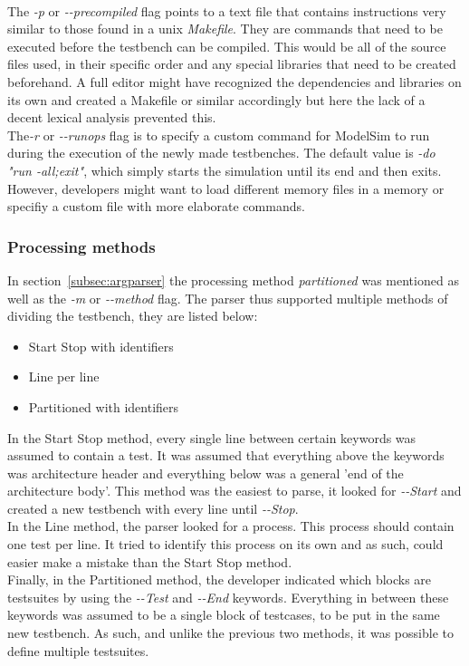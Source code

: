 \documentclass[11pt,british]{article}
\begin{document}
\\[\baselineskip]
The \emph{-p} or \emph{-\--precompiled} flag points to a text file that contains instructions very similar to those found in a unix \emph{Makefile}. They are commands that need to be executed before the testbench can be compiled. This would be all of the source files used, in their specific order and any special libraries that need to be created beforehand. A full editor might have recognized the dependencies and libraries on its own and created a Makefile or similar accordingly but here the lack of a decent lexical analysis prevented this.
\\[\baselineskip]
The\emph{-r} or \emph{-\--runops} flag is to specify a custom command for ModelSim to run during the execution of the newly made testbenches. The default value is \emph{-do "run -all;exit"}, which simply starts the simulation until its end and then exits. However, developers might want to load different memory files in a memory or specifiy a custom file with more elaborate commands.

\subsubsection{Processing methods}
\label{subsubsec:processmethods}
In section~\ref{subsec:argparser} the processing method \emph{partitioned} was mentioned as well as the \emph{-m} or \emph{-\--method} flag. The parser thus supported multiple methods of dividing the testbench, they are listed below:
\begin{itemize}%
\item Start Stop with identifiers
\item Line per line 
\item Partitioned with identifiers
\end{itemize}
In the Start Stop method, every single line between certain keywords was assumed to contain a test. It was assumed that everything above the keywords was architecture header and everything below was a general 'end of the architecture body'. This method was the easiest to parse, it looked for \emph{-\--Start} and created a new testbench with every line until \emph{-\--Stop}.
\\[\baselineskip]
In the Line method, the parser looked for a process. This process should contain one test per line. It tried to identify this process on its own and as such, could easier make a mistake than the Start Stop method.
\\[\baselineskip]
Finally, in the Partitioned method, the developer indicated which blocks are testsuites by using the \emph{-\--Test} and \emph{-\--End} keywords. Everything in between these keywords was assumed to be a single block of testcases, to be put in the same new testbench. As such, and unlike the previous two methods, it was possible to define multiple testsuites. 
\end{document}
